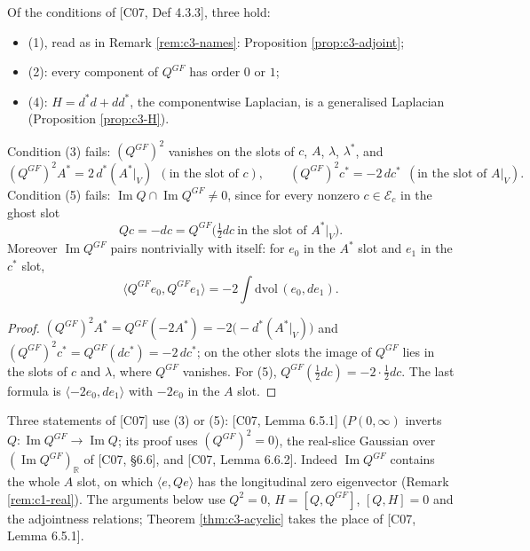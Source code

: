 \begin{proposition}
\label{prop:c3-axioms}
Of the conditions of [C07, Def 4.3.3], three hold:
\begin{itemize}
\item (1), read as in Remark \ref{rem:c3-names}: Proposition \ref{prop:c3-adjoint};
\item (2): every component of $Q^{GF}$ has order $0$ or $1$;
\item (4): $H=d^*d+dd^*$, the componentwise Laplacian, is a generalised Laplacian (Proposition \ref{prop:c3-H}).
\end{itemize}
Condition (3) fails: $(Q^{GF})^2$ vanishes on the slots of $c$, $A$, $\lambda$, $\lambda^*$, and
\[
(Q^{GF})^2A^*=2\,d^*(A^*|_V)\ \ (\text{in the slot of }c),\qquad (Q^{GF})^2c^*=-2\,dc^*\ \ (\text{in the slot of }A|_V).
\]
Condition (5) fails: $\operatorname{Im}Q\cap\operatorname{Im}Q^{GF}\neq0$, since for every nonzero $c\in\mathscr E_c$ in the ghost slot
\[
Qc=-dc=Q^{GF}\big(\tfrac12dc\ \text{in the slot of }A^*|_V\big).
\]
Moreover $\operatorname{Im}Q^{GF}$ pairs nontrivially with itself: for $e_0$ in the $A^*$ slot and $e_1$ in the $c^*$ slot,
\[
\langle Q^{GF}e_0,Q^{GF}e_1\rangle=-2\int\mathrm{dvol}\,(e_0,de_1).
\]
\end{proposition}

\begin{proof}
$(Q^{GF})^2A^*=Q^{GF}(-2A^*)=-2\big(-d^*(A^*|_V)\big)$ and $(Q^{GF})^2c^*=Q^{GF}(dc^*)=-2\,dc^*$; on the other slots the image of $Q^{GF}$ lies in the slots of $c$ and $\lambda$, where $Q^{GF}$ vanishes. For (5), $Q^{GF}(\tfrac12dc)=-2\cdot\tfrac12dc$. The last formula is $\langle-2e_0,de_1\rangle$ with $-2e_0$ in the $A$ slot.
\end{proof}

\begin{remark}
Three statements of [C07] use (3) or (5): [C07, Lemma 6.5.1] ($P(0,\infty)$ inverts $Q\colon\operatorname{Im}Q^{GF}\to\operatorname{Im}Q$; its proof uses $(Q^{GF})^2=0$), the real-slice Gaussian over $(\operatorname{Im}Q^{GF})_{\mathbb R}$ of [C07, §6.6], and [C07, Lemma 6.6.2]. Indeed $\operatorname{Im}Q^{GF}$ contains the whole $A$ slot, on which $\langle e,Qe\rangle$ has the longitudinal zero eigenvector (Remark \ref{rem:c1-real}). The arguments below use $Q^2=0$, $H=[Q,Q^{GF}]$, $[Q,H]=0$ and the adjointness relations; Theorem \ref{thm:c3-acyclic} takes the place of [C07, Lemma 6.5.1].
\end{remark}

